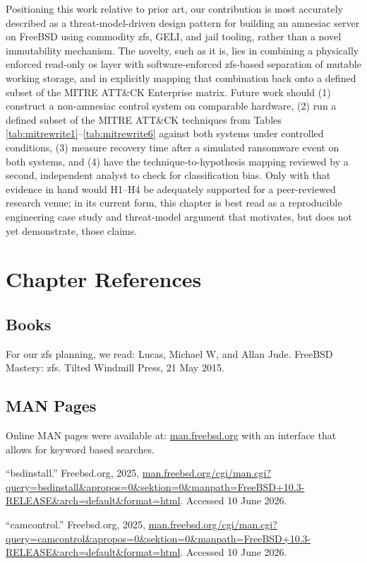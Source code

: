 Positioning this work relative to prior art, our contribution is most accurately described as a threat-model-driven design pattern for building an amnesiac server on FreeBSD using commodity \gls{zfs}, GELI, and \gls{jail} tooling, rather than a novel immutability mechanism.  The novelty, such as it is, lies in combining a physically enforced read-only \gls{os} layer with software-enforced \gls{zfs}-based separation of mutable working storage, and in explicitly mapping that combination back onto a defined subset of the MITRE ATT\&CK Enterprise matrix.  Future work should (1) construct a non-amnesiac control system on comparable hardware, (2) run a defined subset of the MITRE ATT\&CK techniques from Tables \ref{tab:mitrewrite1}--\ref{tab:mitrewrite6} against both systems under controlled conditions, (3) measure recovery time after a simulated \gls{ransomware} event on both systems, and (4) have the technique-to-hypothesis mapping reviewed by a second, independent analyst to check for classification bias.  Only with that evidence in hand would H1--H4 be adequately supported for a peer-reviewed research venue; in its current form, this chapter is best read as a reproducible engineering case study and threat-model argument that motivates, but does not yet demonstrate, those claims.

\section{Chapter References}
\subsection{Books}
For our \gls{zfs} planning, we read: Lucas, Michael W, and Allan Jude. FreeBSD Mastery: \gls{zfs}. Tilted Windmill Press, 21 May 2015.

\subsection{MAN Pages}
Online MAN pages were available at: \url{man.freebsd.org} with an interface that allows for keyword based searches.

 “bsdinstall.'' Freebsd.org, 2025, \url{man.freebsd.org/cgi/man.cgi?query=bsdinstall&apropos=0&sektion=0&manpath=FreeBSD+10.3-RELEASE&arch=default&format=html}. Accessed 10 June 2026.

“camcontrol.” Freebsd.org, 2025, \url{man.freebsd.org/cgi/man.cgi?query=camcontrol&apropos=0&sektion=0&manpath=FreeBSD+10.3-RELEASE&arch=default&format=html}. Accessed 10 June 2026.

